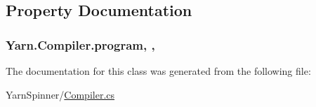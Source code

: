 \subsection{Property Documentation}
\hypertarget{a00034_aa1737da428ec7d597009661dd8a47829}{
\subsubsection[{program}]{ Yarn.\-Compiler.\-program\hspace{0.3cm}{\ttfamily [get]}, {\ttfamily [set]}, {\ttfamily [package]}}}\label{a00034_aa1737da428ec7d597009661dd8a47829}


The documentation for this class was generated from the following file\-:\begin{DoxyCompactItemize}
\item 
Yarn\-Spinner/\hyperlink{a00264}{Compiler.\-cs}\end{DoxyCompactItemize}
